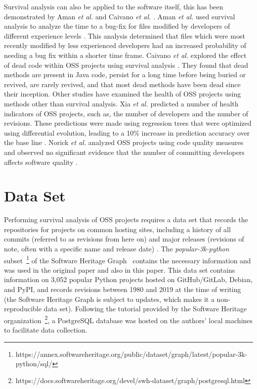 \documentclass[sigconf]{acmart}
\begin{document}
Survival analysis can also be applied to the software itself, this has been demonstrated by Aman \emph{et al.} \cite{aman2017survival} and Caivano \emph{et al.} \cite{caivano2021exploratory}. 
Aman \emph{et al.} used survival analysis to analyze the time to a bug-fix for files modified by developers of different experience levels \cite{aman2017survival}. 
This analysis determined that files which were most recently modified by less experienced developers had an increased probability of needing a bug fix within a shorter time frame. 
Caivano \emph{et al.} explored the effect of dead code within OSS projects using survival analysis \cite{caivano2021exploratory}. 
They found that dead methods are present in Java code, persist for a long time before being buried or revived, are rarely revived, and that most dead methods have been dead since their inception. 
Other studies have examined the health of OSS projects using methods other than survival analysis. 
Xia \emph{et al.} predicted a number of health indicators of OSS projects, such as, the number of developers and the number of revisions.
These predictions were made using regression trees that were optimized using differential evolution, leading to a 10\% increase in prediction accuracy over the base line \cite{xia2020predicting}. 
Norick \emph{et al.} analyzed OSS projects using code quality measures and observed no significant evidence that the number of committing developers affects software quality \cite{norick2010effects}. 

\section{Data Set} \label{data}

Performing survival analysis of OSS projects requires a data set that records the repositories for projects on common hosting sites, including a history of all commits (referred to as revisions from here on) and major releases (revisions of note, often with a specific name and release date) \cite{ali2020cheating}. 
The \emph{popular-3k-python} subset~\footnote{https://annex.softwareheritage.org/public/dataset/graph/latest/popular-3k-python/sql/} of the Software Heritage Graph~\cite{pietri2019software} contains the necessary information and was used in the original paper and also in this paper.
This data set contains information on 3,052 popular Python projects hosted on GitHub/GitLab, Debian, and PyPI, and records revisions between 1980 and 2019 at the time of writing (the Software Heritage Graph is subject to updates, which makes it a non-reproducible data set).
Following the tutorial provided by the Software Heritage organization~\footnote{https://docs.softwareheritage.org/devel/swh-dataset/graph/postgresql.html}, a PostgreSQL database was hosted on the authors' local machines to facilitate data collection.
\end{document}
